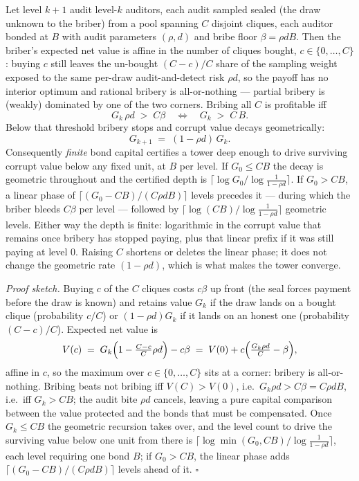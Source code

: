 \documentclass[11pt,a4paper]{article}
\begin{document}
\begin{thebox}
\begin{theorem}\label{thm:tower}
Let level $k{+}1$ audit level-$k$ auditors, each audit sampled sealed (the draw unknown to the briber) from a pool spanning $C$ disjoint cliques, each auditor bonded at $B$ with audit parameters $(\rho, d)$ and bribe floor $\beta = \rho d B$. Then the briber's expected net value is affine in the number of cliques bought, $c \in \{0,\dots,C\}$: buying $c$ still leaves the un-bought $(C{-}c)/C$ share of the sampling weight exposed to the same per-draw audit-and-detect risk $\rho d$, so the payoff has no interior optimum and rational bribery is all-or-nothing --- partial bribery is (weakly) dominated by one of the two corners. Bribing all $C$ is profitable iff
\[ G_k \,\rho d \;>\; C\beta \quad\Longleftrightarrow\quad G_k \;>\; C\,B. \]
Below that threshold bribery stops and corrupt value decays geometrically:
\[ G_{k+1} \;=\; (1-\rho d)\,G_k. \]
Consequently \emph{finite} bond capital certifies a tower deep enough to drive surviving corrupt value below any fixed unit, at $B$ per level. If $G_0 \le CB$ the decay is geometric throughout and the certified depth is $\lceil \log G_0 / \log\tfrac{1}{1-\rho d} \rceil$. If $G_0 > CB$, a linear phase of $\lceil (G_0 - CB)/(C\rho d B) \rceil$ levels precedes it --- during which the briber bleeds $C\beta$ per level --- followed by $\lceil \log (CB) / \log\tfrac{1}{1-\rho d} \rceil$ geometric levels. Either way the depth is finite: logarithmic in the corrupt value that remains once bribery has stopped paying, plus that linear prefix if it was still paying at level $0$. Raising $C$ shortens or deletes the linear phase; it does not change the geometric rate $(1-\rho d)$, which is what makes the tower converge.
\end{theorem}
\end{thebox}

\emph{Proof sketch.} Buying $c$ of the $C$ cliques costs $c\beta$ up front (the seal forces payment before the draw is known) and retains value $G_k$ if the draw lands on a bought clique (probability $c/C$) or $(1-\rho d)G_k$ if it lands on an honest one (probability $(C{-}c)/C$). Expected net value is
\[ V(c) \;=\; G_k\Bigl(1 - \tfrac{C-c}{C}\rho d\Bigr) - c\beta \;=\; V(0) + c\Bigl(\tfrac{G_k \rho d}{C} - \beta\Bigr), \]
affine in $c$, so the maximum over $c \in \{0,\dots,C\}$ sits at a corner: bribery is all-or-nothing. Bribing beats not bribing iff $V(C) > V(0)$, i.e.\ $G_k \rho d > C\beta = C\rho d B$, i.e.\ iff $G_k > C B$; the audit bite $\rho d$ cancels, leaving a pure capital comparison between the value protected and the bonds that must be compensated. Once $G_k \le CB$ the geometric recursion takes over, and the level count to drive the surviving value below one unit from there is $\lceil \log \min(G_0, CB) / \log\frac{1}{1-\rho d} \rceil$, each level requiring one bond $B$; if $G_0 > CB$, the linear phase adds $\lceil (G_0-CB)/(C\rho d B) \rceil$ levels ahead of it. \hfill$\square$
\end{document}
